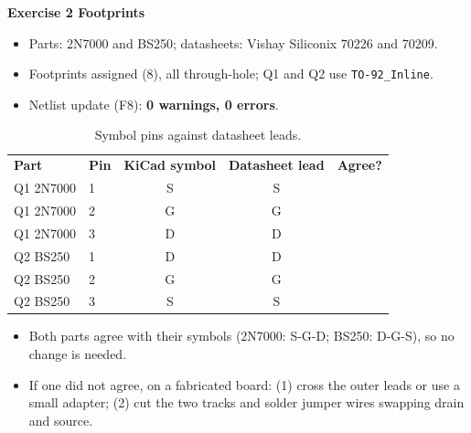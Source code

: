 \documentclass[11pt,a4paper]{article}
\newcommand{\ok}{\textcolor{teal}{\ding{51}}}
\newcommand{\exhead}[2]{\Needspace{8\baselineskip}\vspace{8pt}\begin{tcolorbox}[enhanced,colback=teal,colframe=teal,arc=2pt,boxrule=0pt,left=8pt,right=8pt,top=3pt,bottom=3pt]\sffamily\bfseries\color{white}\large #1 \hfill{\normalsize\bfseries #2}\end{tcolorbox}\vspace{-2pt}}
\begin{document}
\exhead{Exercise 2}{Footprints}
\begin{itemize}
\item Parts: 2N7000 and BS250; datasheets: Vishay Siliconix 70226 and 70209.
\item Footprints assigned (8), all through-hole; Q1 and Q2 use \texttt{TO-92\_Inline}.
\item Netlist update (F8): \textbf{0 warnings, 0 errors}.
\end{itemize}
\begin{table}[H]\centering\small\sffamily
\begin{tabular}{@{}llccc@{}}\rowcolor{teal}\color{white}\textbf{Part}&\color{white}\textbf{Pin}&\color{white}\textbf{KiCad symbol}&\color{white}\textbf{Datasheet lead}&\color{white}\textbf{Agree?}\\
Q1 2N7000&1&S&S&\ok\\ Q1 2N7000&2&G&G&\ok\\ Q1 2N7000&3&D&D&\ok\\
\rowcolor{mist}Q2 BS250&1&D&D&\ok\\ \rowcolor{mist}Q2 BS250&2&G&G&\ok\\ \rowcolor{mist}Q2 BS250&3&S&S&\ok\\\end{tabular}
\caption{Symbol pins against datasheet leads.}\end{table}
\begin{answer}
\begin{itemize}
\item Both parts agree with their symbols (2N7000: S-G-D; BS250: D-G-S), so no change is needed.
\item If one did not agree, on a fabricated board: (1) cross the outer leads or use a small adapter; (2) cut the two tracks and solder jumper wires swapping drain and source.
\end{itemize}
\end{answer}
\end{document}
